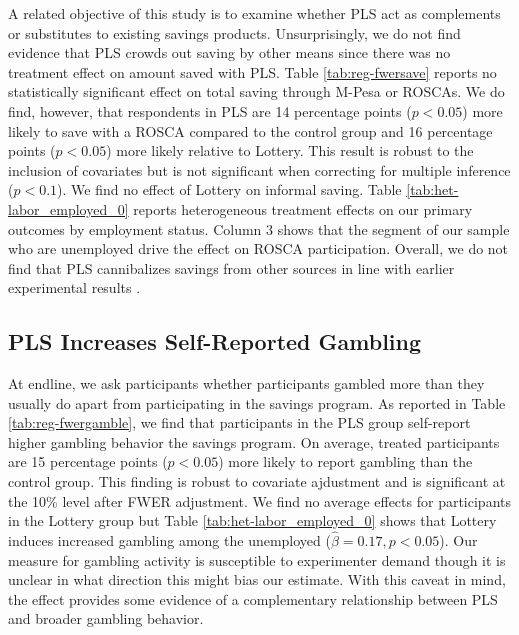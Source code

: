 \documentclass[11pt]{article}
\begin{document}
		A related objective of this study is to examine whether PLS act as complements or substitutes to existing savings products. Unsurprisingly, we do not find evidence that PLS crowds out saving by other means since there was no treatment effect on amount saved with PLS. Table \ref{tab:reg-fwersave} reports no statistically significant effect on total saving through M-Pesa or ROSCAs. We do find, however, that respondents in PLS are 14 percentage points ($p < 0.05$) more likely to save with a ROSCA compared to the control group and 16 percentage points ($p < 0.05$) more likely relative to Lottery. This result is robust to the inclusion of covariates but is not significant when correcting for multiple inference ($p < 0.1$). We find no effect of Lottery on informal saving. Table \ref{tab:het-labor_employed_0} reports heterogeneous treatment effects on our primary outcomes by employment status. Column 3 shows that the segment of our sample who are unemployed drive the effect on ROSCA participation. Overall, we do not find that PLS cannibalizes savings from other sources in line with earlier experimental results \parencite{atalay_savings_2014,filiz-ozbay_lottery_2015,dizon_leveraging_2016}.

		
		

	\subsection{PLS Increases Self-Reported Gambling}


		At endline, we ask participants whether participants gambled more than they usually do apart from participating in the savings program. As reported in Table \ref{tab:reg-fwergamble}, we find that participants in the PLS group self-report higher gambling behavior the savings program. On average, treated participants are 15 percentage points ($p < 0.05$) more likely to report gambling than the control group. This finding is robust to covariate ajdustment and is significant at the 10\% level after FWER adjustment. We find no average effects for participants in the Lottery group but Table \ref{tab:het-labor_employed_0} shows that Lottery induces increased gambling among the unemployed ($\hat \beta = 0.17, p < 0.05$). Our measure for gambling activity is susceptible to experimenter demand though it is unclear in what direction this might bias our estimate. With this caveat in mind, the effect provides some evidence of a complementary relationship between PLS and broader gambling behavior.
\end{document}
